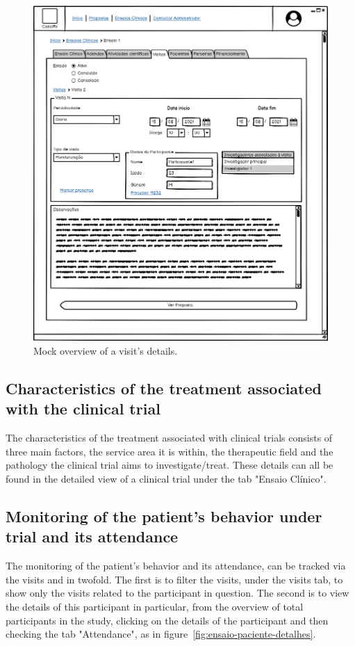 \begin{figure}[H]
    \centering
    \includegraphics[scale=0.35]{Chapters/img/ensaios/ensaio-visita-detalhes.png}
    \caption{Mock overview of a visit's details.}
    \label{fig:ensaio-visita-detalhes}
\end{figure}


\subsection{Characteristics of the treatment associated with the clinical trial}
The characteristics of the treatment associated with clinical trials consists of three main factors, the service area it is within, the therapeutic field and the pathology the clinical trial aims to investigate/treat. These details can all be found in the detailed view of a clinical trial under the tab "Ensaio Clínico".  

\subsection{Monitoring of the patient’s behavior under trial and its attendance}
The monitoring of the patient's behavior and its attendance, can be tracked via the visits and in twofold. The first is to filter the visits, under the visits tab, to show only the visits related to the participant in question. The second is to view the details of this participant in particular, from the overview of total participants in the study, clicking on the details of the participant and then checking the tab "Attendance", as in figure~\ref{fig:ensaio-paciente-detalhes}. 

